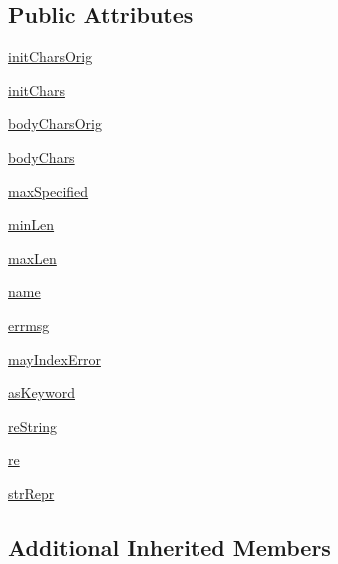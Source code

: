 \subsection*{Public Attributes}
\begin{DoxyCompactItemize}
\item 
\hyperlink{classpkg__resources_1_1__vendor_1_1pyparsing_1_1Word_a109fa1d1399a2c0f7c37ef5382af6e88}{init\+Chars\+Orig}
\item 
\hyperlink{classpkg__resources_1_1__vendor_1_1pyparsing_1_1Word_a572e2abc2af8e9b8822c869511193a83}{init\+Chars}
\item 
\hyperlink{classpkg__resources_1_1__vendor_1_1pyparsing_1_1Word_aa8b174daa77b6d6fc1a545a4d45cb590}{body\+Chars\+Orig}
\item 
\hyperlink{classpkg__resources_1_1__vendor_1_1pyparsing_1_1Word_a12e408c631e1573c85f0ec904f37a0b4}{body\+Chars}
\item 
\hyperlink{classpkg__resources_1_1__vendor_1_1pyparsing_1_1Word_a13a414f0bf668368498cd98c19a96f65}{max\+Specified}
\item 
\hyperlink{classpkg__resources_1_1__vendor_1_1pyparsing_1_1Word_a0b23e3c88b0500fda079f60624a39f14}{min\+Len}
\item 
\hyperlink{classpkg__resources_1_1__vendor_1_1pyparsing_1_1Word_a4e48d8e8e0080d77ba3ce7dba9a5b309}{max\+Len}
\item 
\hyperlink{classpkg__resources_1_1__vendor_1_1pyparsing_1_1Word_a0a5d6d1b4c777f4987abb7f231faaf45}{name}
\item 
\hyperlink{classpkg__resources_1_1__vendor_1_1pyparsing_1_1Word_a816574694265a40c330e44280b1053dd}{errmsg}
\item 
\hyperlink{classpkg__resources_1_1__vendor_1_1pyparsing_1_1Word_a9e9945a19e053e229a84970ba8883c11}{may\+Index\+Error}
\item 
\hyperlink{classpkg__resources_1_1__vendor_1_1pyparsing_1_1Word_ae25914c020a5278f45324d90e776c6e8}{as\+Keyword}
\item 
\hyperlink{classpkg__resources_1_1__vendor_1_1pyparsing_1_1Word_aea5fdb30360780bfcde0c0aa14655491}{re\+String}
\item 
\hyperlink{classpkg__resources_1_1__vendor_1_1pyparsing_1_1Word_a327ed993cdd9e2091a145db6501df4ec}{re}
\item 
\hyperlink{classpkg__resources_1_1__vendor_1_1pyparsing_1_1Word_a079c355183815cadc9ee98f2d113d867}{str\+Repr}
\end{DoxyCompactItemize}
\subsection*{Additional Inherited Members}


